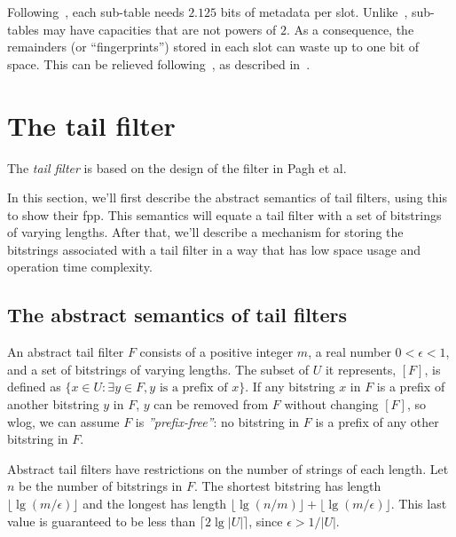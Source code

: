 \documentclass[11pt,letterpaper]{article}
\begin{document}
Following~\cite{pandey2017general}, each sub-table needs $2.125$ bits of metadata per slot.
Unlike~\cite{pandey2017general}, sub-tables may have capacities that are not powers of $2$.
As a consequence, the remainders (or ``fingerprints'') stored in each slot can waste up to one bit of space.
This can be relieved following~\cite{trits}, as described in~\cite{10.1007/978-3-030-25027-0_3}.

\section{The tail filter}

The {\em tail filter} is based on the design of the filter in Pagh et al.~\cite{DBLP:journals/corr/abs-1304-1188}

In this section, we'll first describe the abstract semantics of tail filters, using this to show their fpp.
This semantics will equate a tail filter with a set of bitstrings of varying lengths.
After that, we'll describe a mechanism for storing the bitstrings associated with a tail filter in a way that has low space usage and operation time complexity.

\subsection{The abstract semantics of tail filters}

An abstract tail filter $F$ consists of a positive integer $m$, a real number $0 < \epsilon < 1$, and a set of bitstrings of varying lengths. %
The subset of $U$ it represents, $[F]$, is defined as $\{x \in U : \exists y \in F, y \textrm{ is a prefix of } x\}$.
If any bitstring $x$ in $F$ is a prefix of another bitstring $y$ in $F$, $y$ can be removed from $F$ without changing $[F]$, so wlog, we can assume $F$ is {\em ''prefix-free''}: no bitstring in $F$ is a prefix of any other bitstring in $F$.


Abstract tail filters have restrictions on the number of strings of each length.
Let $n$ be the number of bitstrings in $F$.
The shortest bitstring has length $\lfloor \lg (m / \epsilon) \rfloor$ and the longest has length $\lfloor \lg (n/m) \rfloor + \lfloor \lg (m / \epsilon) \rfloor$.
This last value is guaranteed to be less than $\lceil 2 \lg |U| \rceil$, since $\epsilon > 1/|U|$.
\end{document}
